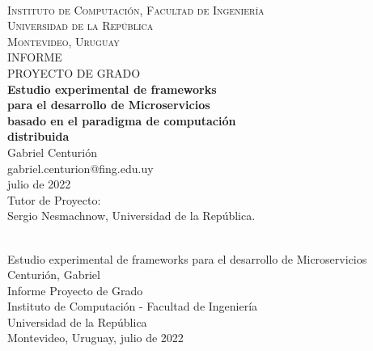 \begin{titlepage}
  \thispagestyle{empty}
  \begin{center}
    ~\\[0.0cm]
    \textsc{\large Instituto de Computaci\'on, Facultad de Ingenier\'ia} \\[0.5cm]
    \textsc{\large Universidad de la Rep\'ublica} \\[0.2cm]
    \textsc{\large Montevideo, Uruguay} \\[2.5cm]
    \textsc{\Huge INFORME} \\[0.2cm]
    \textsc{\Huge PROYECTO DE GRADO} \\[2.0cm]
    \textbf{\huge Estudio experimental de frameworks } \\[0.2cm]
    \textbf{\huge para el desarrollo de Microservicios } \\[0.2cm]
    \textbf{\huge basado en el paradigma de computación } \\[0.2cm]
    \textbf{\huge distribuida} \\[2.5cm]
    {\Large Gabriel Centuri\'on} \\[0.2cm]
    {\Large gabriel.centurion@fing.edu.uy} \\[1.5cm]
    {\Large julio de 2022} \\[1.5cm]
    {\Large Tutor de Proyecto: \\[0.5cm] Sergio Nesmachnow, Universidad de la Rep\'ublica.}
    
  \end{center}
  \vfill
\end{titlepage}

{
  \thispagestyle{empty}
  ~\\[16cm]
Estudio experimental de frameworks para el desarrollo de Microservicios\\
Centuri\'on, Gabriel\\
Informe Proyecto de Grado\\
Instituto de Computaci\'on - Facultad de Ingenier\'ia\\
Universidad de la Rep\'ublica\\
Montevideo, Uruguay, julio de 2022
  \vfill
  \cleardoublepage
}
\setcounter{page}{1}

